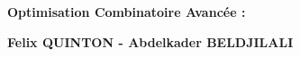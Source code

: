
\begin{titlepage}
	\parindent=0pt
 
\addtolength{\wpXoffset}{-4.5cm}

	
	\hrulefill
	\begin{center}\bfseries\Huge
		\color{white}
		{Optimisation Combinatoire Avancée : } 
	\end{center}
	\hrulefill
	
	\vspace*{1cm}
	\begin{center}\bfseries\Large
			\color{white}
		{Felix QUINTON - Abdelkader BELDJILALI}
		
	\end{center}
	


\end{titlepage}
